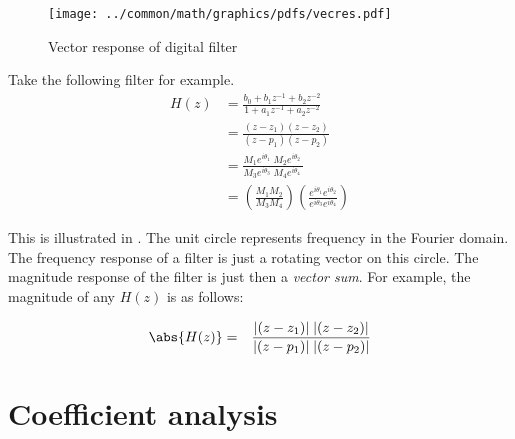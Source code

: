 \begin{figure}[ht]
  \centering%
  \texttt{[image: ../common/math/graphics/pdfs/vecres.pdf]}
  \caption{
     Vector response of digital filter 
     \label{fig:zchar_vector}
     }
\end{figure}
\begin{example}
\label{ex:zchar_vector}
Take the following filter for example.
\begin{align*}
   H(z) &= \frac{b_0 + b_1z^{-1} + b_2z^{-2} }
                {1   + a_1z^{-1} + a_2z^{-2} }
   \\   &= \frac{(z-z_1)(z-z_2)}
                {(z-p_1)(z-p_2)}
   \\   &= \frac{M_1e^{i\theta_1} \; M_2e^{i\theta_2} \; }
                {M_3e^{i\theta_3} \; M_4e^{i\theta_4} \; }
   \\   &= \left(\frac{M_1M_2}{M_3M_4} \right)
           \left(\frac{e^{i\theta_1} e^{i\theta_2} }
                      {e^{i\theta_3} e^{i\theta_4} }\right)
\end{align*}

This is illustrated in .
The unit circle represents frequency in the Fourier domain.
The frequency response of a filter is just a rotating vector on this circle.
The magnitude response of the filter is just then a {\em vector sum}.
For example, the magnitude of any $H(z)$ is as follows:

\begin{align*}
   \abs{H(z)} &=& \frac{|(z-z_1)|\;|(z-z_2)|}
                 {|(z-p_1)|\;|(z-p_2)|}
\end{align*}
\end{example}

\section{Coefficient analysis}
\begin{lemma}
\label{lem:aacos}
\end{lemma}

